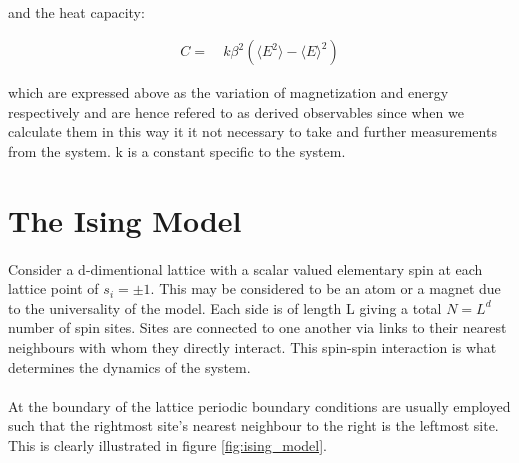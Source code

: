 \documentclass[12pt] {report} %
\begin{document}
				\paragraph{}
					and the heat capacity:
					
			\begin{align}
				C =& \: k \beta^2 (\langle E^2 \rangle - \langle E \rangle^2)		\label{eq:heat_capacity}
			\end{align}
			
			which are expressed above as the variation of magnetization and energy respectively and are hence refered to as derived observables since when we calculate them in this way it it not necessary to take and further measurements from the system. k is a constant specific to the system.
				
		
		\section{The Ising Model} \label{sec:Ising model}
		
			\paragraph{}
				Consider a d-dimentional lattice with a scalar valued elementary spin at each lattice point of $s_i = \pm 1$. This may be considered to be an atom or a magnet due to the universality of the model. Each side is of length L giving a total $N = L^d$ number of spin sites. Sites are connected to one another via links to their nearest neighbours with whom they directly interact. This spin-spin interaction is what determines the dynamics of the system.
				
			\paragraph{}
				At the boundary of the lattice periodic boundary conditions are usually employed such that the rightmost site's nearest neighbour to the right is the leftmost site. This is clearly illustrated in figure \ref{fig:ising_model}.
			
\end{document}
